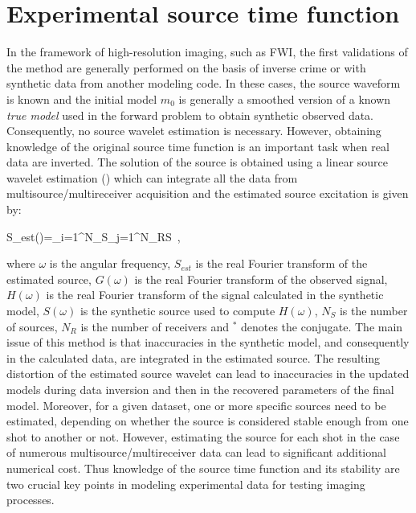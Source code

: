 \documentclass[extra,mreferee]{gji}
\newenvironment{orangenote}{\par\color{Orange}}{\par}
\begin{document}

\begin{orangenote}
\section{Experimental source time function}

In the framework of high-resolution imaging, such as FWI, the first validations of the method are generally performed on the basis of inverse crime or with synthetic data from another modeling code. In these cases, the source waveform is known and the initial model $m_{0}$ is generally a smoothed version of a known \textit{true model} used in the forward problem to obtain synthetic observed data. Consequently, no source wavelet estimation is necessary. However, obtaining knowledge of the original source time function is an important task when real data are inverted. The solution of the source is obtained using a linear source wavelet estimation (\cite{pratt1999fwi,virieux2009fwi}) which can integrate all the data from multisource/multireceiver acquisition and the estimated source excitation is given by:

\equation
S_{est}(\omega)=\sum\limits_{i=1}^{N_{S}}\sum\limits_{j=1}^{N_{R}}S\ ,
\label{eq:lswe}
\endequation

where $\omega$ is the angular frequency, $S_{est}$ is the real Fourier transform of the estimated source, $G(\omega)$ is the real Fourier transform of the observed signal, $H(\omega)$ is the real Fourier transform of the signal calculated in the synthetic model, $S(\omega)$ is the synthetic source used to compute $H(\omega)$, $N_{S}$ is the number of sources, $N_{R}$ is the number of receivers and $^{*}$ denotes the conjugate. The main issue of this method is that inaccuracies in the synthetic model, and consequently in the calculated data, are integrated in the estimated source. The resulting distortion of the estimated source wavelet can lead to inaccuracies in the updated models during data inversion and then in the recovered parameters of the final model. Moreover, for a given dataset, one or more specific sources need to be estimated, depending on whether the source is considered stable enough from one shot to another or not. However, estimating the source for each shot in the case of numerous multisource/multireceiver data can lead to significant additional numerical cost. Thus knowledge of the source time function and its stability are two crucial key points in modeling experimental data for testing imaging processes.


\end{orangenote}
\end{document}
